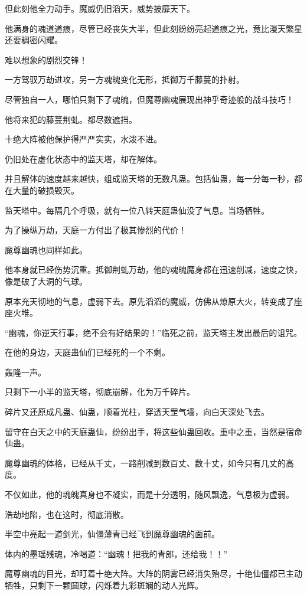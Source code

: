 \begin{this_body}
但此刻他全力动手。魔威仍旧滔天，威势披靡天下。

他满身的魂道道痕，尽管已经丧失大半，但此刻纷纷亮起道痕之光，竟比漫天繁星还要稠密闪耀。

难以想象的剧烈交锋！

一方驾驭万劫进攻，另一方魂魄变化无形，抵御万千藤蔓的扑射。

尽管独自一人，哪怕只剩下了魂魄，但魔尊幽魂展现出神乎奇迹般的战斗技巧！

他将来犯的藤蔓荆虬。都尽数遮挡。

十绝大阵被他保护得严严实实，水泼不进。

仍旧处在虚化状态中的监天塔，却在解体。

并且解体的速度越来越快，组成监天塔的无数凡蛊。包括仙蛊，每一分每一秒，都在大量的破损毁灭。

监天塔中。每隔几个呼吸，就有一位八转天庭蛊仙没了气息。当场牺牲。

为了操纵万劫，天庭一方付出了极其惨烈的代价！

魔尊幽魂也同样如此。

他本身就已经伤势沉重。抵御荆虬万劫，他的魂魄魔身都在迅速削减，速度之快，像是破了大洞的气球。

原本充天彻地的气息，虚弱下去。原先滔滔的魔威，仿佛从燎原大火，转变成了座座火堆。

“幽魂，你逆天行事，绝不会有好结果的！”临死之前，监天塔主发出最后的诅咒。

在他的身边，天庭蛊仙们已经死的一个不剩。

轰隆一声。

只剩下一小半的监天塔，彻底崩解，化为万千碎片。

碎片又还原成凡蛊、仙蛊，顺着光柱，穿透天罡气墙，向白天深处飞去。

留守在白天之中的天庭蛊仙，纷纷出手，将这些仙蛊回收。重中之重，当然是宿命仙蛊。

魔尊幽魂的体格，已经从千丈，一路削减到数百丈、数十丈，如今只有几丈的高度。

不仅如此，他的魂魄真身也不凝实，而是十分透明，随风飘逸，气息极为虚弱。

浩劫地陷，也在这时，彻底消散。

半空中亮起一道剑光，仙僵薄青已经飞到魔尊幽魂的面前。

体内的墨瑶残魂，冷喝道：“幽魂！把我的青郎，还给我！！”

魔尊幽魂的目光，却盯着十绝大阵。大阵的阴雾已经消失殆尽，十绝仙僵都已主动牺牲，只剩下一颗圆球，闪烁着九彩斑斓的动人光辉。


\end{this_body}
